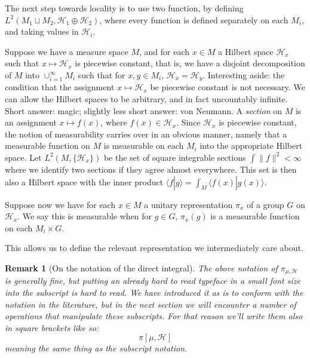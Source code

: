 \documentclass[
  12pt
]{article}
\theoremstyle{break}
\theoremstyle{plain}
\newtheorem*{rk}{Remark}
\newcommand{\hilb}{\ensuremath{\mathscr{H}}}
\begin{document}

  The next step towards locality is to use two function, by defining
  $L^2(M_1 \sqcup M_2, \mathscr{H}_1 \oplus \mathscr{H}_2)$, where every
  function is defined separately on each $M_i$, and taking values in
  $\mathscr{H}_i$.



  Suppose we have a measure space $M$, and for each $x \in M$ a
  Hilbert space $\mathscr{H}_x$ such that $x \mapsto \mathscr{H}_x$ is
  piecewise constant, that is, we have a disjoint decomposition of $M$
  into $\cup_{i=1}^{\infty} M_i$ such that for $x,y \in M_i$,
  $\mathscr{H}_x = \mathscr{H}_y$. 
  Interesting aside: the condition that the assignment
  $x \mapsto \mathscr{H}_x$ be piecewise constant is not necessary. We
  can allow the Hilbert spaces to be arbitrary, and in fact uncountably
  infinite. Short answer: magic; slightly less short answer: von Neumann.
  A \emph{section} on $M$ is an assignment $x \mapsto f(x)$, where
  $f(x) \in \mathscr{H}_x$. Since $\mathscr{H}_x$ is piecewise
  constant, the notion of measurability carries over in an obvious manner,
  namely that a measurable function on $M$ is measurable on each $M_i$
  into the appropriate Hilbert space. Let $L^2(M, \{\mathscr{H}_x\})$ be
  the set of square integrable sections $\int \| f \|^2 < \infty$ where
  we identify two sections if they agree almost everywhere. This set is
  then also a Hilbert space with the inner product
  $\langle f | g \rangle = \int_M \langle f(x) | g(x) \rangle$.

  Suppose now we have for each $x \in M$ a unitary representation
  $\pi_x$ of a group $G$ on $\mathscr{H}_x$. We say this is
  measurable when for $g \in G$, $\pi_x(g)$ is a measurable function
  on each $M_i \times G$.

  This allows us to define the relevant representation we intermediately
  care about.

  \begin{rk}[On the notation of the direct integral]
    \label{rem:integral-notation}
    The above notation of $\pi_{\mu, \hilb}$ is generally fine, but putting an
    already hard to read typeface in a small font size into the subscript is
    hard to read. We have introduced it as is to conform with the notation in
    the literature, but in the next section we will encounter a number of
    operations that manipulate these subscripts. For that reason we'll write
    them also in square brackets like so:
    $$
    \pi[\mu, \hilb]
    $$
    meaning the same thing as the subscript notation.
  \end{rk}
\end{document}
